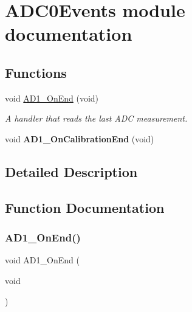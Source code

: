 \hypertarget{group___a_d_c0_events__module}{}\section{A\+D\+C0\+Events module documentation}
\label{group___a_d_c0_events__module}
\subsection*{Functions}
\begin{DoxyCompactItemize}
\item 
void \hyperlink{group___a_d_c0_events__module_gac0b0e33c722d75df2e7b6eb1d50f15a7}{A\+D1\+\_\+\+On\+End} (void)
\begin{DoxyCompactList}\small\item\em A handler that reads the last A\+DC measurement. \end{DoxyCompactList}\item 
\mbox{\label{group___a_d_c0_events__module_ga8be719cad9ac48a9cdfd2281de15ec59}} 
void {\bfseries A\+D1\+\_\+\+On\+Calibration\+End} (void)
\end{DoxyCompactItemize}


\subsection{Detailed Description}


\subsection{Function Documentation}
\mbox{\label{group___a_d_c0_events__module_gac0b0e33c722d75df2e7b6eb1d50f15a7}} 
\subsubsection{\texorpdfstring{A\+D1\+\_\+\+On\+End()}{AD1\_OnEnd()}}
{\footnotesize\ttfamily void A\+D1\+\_\+\+On\+End (\begin{DoxyParamCaption}\item[{void}]{ }\end{DoxyParamCaption})}



